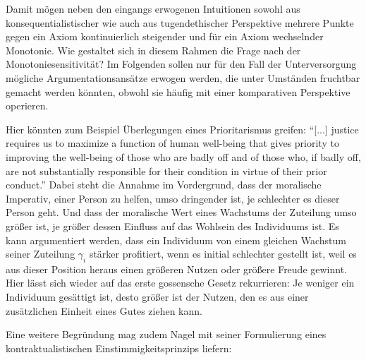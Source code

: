 \documentclass[a4paper]{thesis}
\begin{document}
Damit mögen neben den eingangs erwogenen Intuitionen sowohl aus konsequentialistischer wie auch aus tugendethischer Perspektive mehrere Punkte gegen ein Axiom kontinuierlich steigender und für ein Axiom wechselnder Monotonie. Wie gestaltet sich in diesem Rahmen die Frage nach der Monotoniesensitivität? Im Folgenden sollen nur für den Fall der Unterversorgung mögliche Argumentationsansätze erwogen werden, die unter Umständen fruchtbar gemacht werden könnten, obwohl sie häufig mit einer komparativen Perspektive operieren.

Hier könnten zum Beispiel Überlegungen eines Prioritarismus greifen: \enquote{[...] justice requires us to maximize a function of human well-being that gives priority to improving the well-being of those who are badly off and of those who, if badly off, are not substantially responsible for their condition in virtue of their prior conduct.} Dabei steht die Annahme im Vordergrund, dass der moralische Imperativ, einer Person zu helfen, umso dringender ist, je schlechter es dieser Person geht. Und dass der moralische Wert eines Wachstums der Zuteilung umso größer ist, je größer dessen Einfluss auf das Wohlsein des Individuums ist. Es kann argumentiert werden, dass ein Individuum von einem gleichen Wachstum seiner Zuteilung $\gamma_i$ stärker profitiert, wenn es initial schlechter gestellt ist, weil es aus dieser Position heraus einen größeren Nutzen oder größere Freude gewinnt. Hier lässt sich wieder auf das erste gossensche Gesetz rekurrieren: Je weniger ein Individuum gesättigt ist, desto größer ist der Nutzen, den es aus einer zusätzlichen Einheit eines Gutes ziehen kann.

Eine weitere Begründung mag zudem Nagel mit seiner Formulierung eines kontraktualistischen Einstimmigkeitsprinzips liefern:
\end{document}
